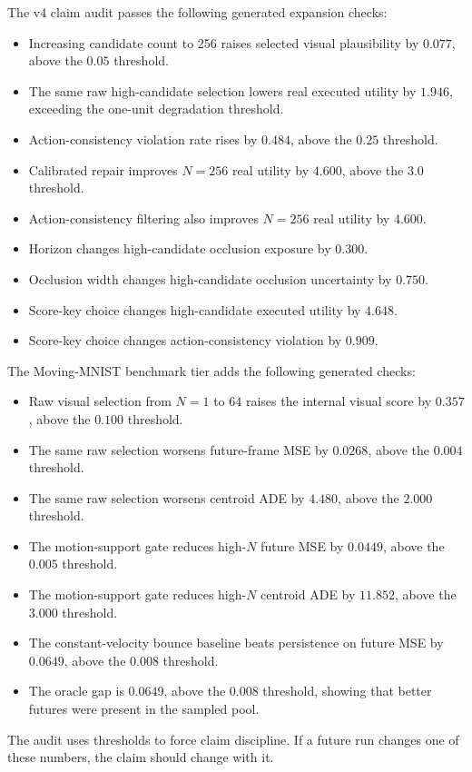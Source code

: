 \documentclass{article}
\begin{document}
The v4 claim audit passes the following generated expansion checks:
\begin{itemize}
  \item Increasing candidate count to 256 raises selected visual plausibility by \(0.077\), above the \(0.05\) threshold.
  \item The same raw high-candidate selection lowers real executed utility by \(1.946\), exceeding the one-unit degradation threshold.
  \item Action-consistency violation rate rises by \(0.484\), above the \(0.25\) threshold.
  \item Calibrated repair improves \(N=256\) real utility by \(4.600\), above the \(3.0\) threshold.
  \item Action-consistency filtering also improves \(N=256\) real utility by \(4.600\).
  \item Horizon changes high-candidate occlusion exposure by \(0.300\).
  \item Occlusion width changes high-candidate occlusion uncertainty by \(0.750\).
  \item Score-key choice changes high-candidate executed utility by \(4.648\).
  \item Score-key choice changes action-consistency violation by \(0.909\).
\end{itemize}
The Moving-MNIST benchmark tier adds the following generated checks:
\begin{itemize}
  \item Raw visual selection from \(N=1\) to \(64\) raises the internal visual score by \(0.357\), above the \(0.100\) threshold.
  \item The same raw selection worsens future-frame MSE by \(0.0268\), above the \(0.004\) threshold.
  \item The same raw selection worsens centroid ADE by \(4.480\), above the \(2.000\) threshold.
  \item The motion-support gate reduces high-\(N\) future MSE by \(0.0449\), above the \(0.005\) threshold.
  \item The motion-support gate reduces high-\(N\) centroid ADE by \(11.852\), above the \(3.000\) threshold.
  \item The constant-velocity bounce baseline beats persistence on future MSE by \(0.0649\), above the \(0.008\) threshold.
  \item The oracle gap is \(0.0649\), above the \(0.008\) threshold, showing that better futures were present in the sampled pool.
\end{itemize}
The audit uses thresholds to force claim discipline. If a future run changes one of these numbers, the claim should change with it.
\end{document}
